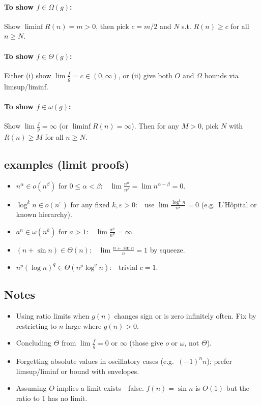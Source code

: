 \documentclass[9pt]{extarticle}
\begin{document}
\paragraph{To show $f\in \Omega(g)$:} Show $\liminf R(n)=m>0$, then pick $c=m/2$ and $N$ s.t. $R(n)\ge c$ for all $n\ge N$.

\paragraph{To show $f\in \Theta(g)$:} Either (i) show $\lim \frac{f}{g}=c\in(0,\infty)$, or (ii) give both $O$ and $\Omega$ bounds via limsup/liminf.

\paragraph{To show $f\in \omega(g)$:} Show $\lim \frac{f}{g}=\infty$ (or $\liminf R(n)=\infty$). Then for any $M>0$, pick $N$ with $R(n)\ge M$ for all $n\ge N$.

\subsection*{examples (limit proofs)}
\begin{itemize}
  \item $n^\alpha \in o(n^\beta)$ for $0\le \alpha<\beta$:\ \ $\lim \frac{n^\alpha}{n^\beta}=\lim n^{\alpha-\beta}=0$.
  \item $\log^k n \in o(n^\varepsilon)$ for any fixed $k,\varepsilon>0$:\ \ use $\lim \frac{\log^k n}{n^\varepsilon}=0$ (e.g.\ L'Hôpital or known hierarchy).
  \item $a^n \in \omega(n^k)$ for $a>1$:\ \ $\lim \frac{a^n}{n^k}=\infty$.
  \item $(n+\sin n)\in \Theta(n)$:\ \ $\lim \frac{n+\sin n}{n}=1$ by squeeze.
  \item $n^p(\log n)^q \in \Theta(n^p \log^q n)$:\ \ trivial $c=1$.
\end{itemize}

\subsection*{Notes}
\begin{itemize}
  \item Using ratio limits when $g(n)$ changes sign or is zero infinitely often. Fix by restricting to $n$ large where $g(n)>0$.
  \item Concluding $\Theta$ from $\lim \frac{f}{g}=0$ or $\infty$ (those give $o$ or $\omega$, not $\Theta$).
  \item Forgetting absolute values in oscillatory cases (e.g.\ $(-1)^n n$); prefer limsup/liminf or bound with envelopes.
  \item Assuming $O$ implies a limit exists—false. $f(n)=\sin n$ is $O(1)$ but the ratio to $1$ has no limit.
\end{itemize}
\end{document}

